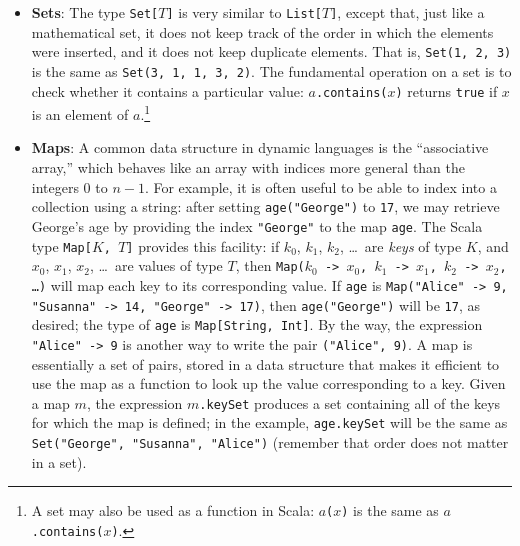 \begin{itemize}
\item \textbf{Sets}: The type \texttt{Set[$T$]} is very similar to \texttt{List[$T$]}, except that, just like a mathematical set, it does not keep track of the order in which the elements were inserted, and it does not keep duplicate elements. That is, \texttt{Set(1, 2, 3)} is the same as \texttt{Set(3, 1, 1, 3, 2)}. The fundamental operation on a set is to check whether it contains a particular value: \texttt{$a$.contains($x$)} returns \texttt{true} if $x$ is an element of $a$.\footnote{A set may also be used as a function in Scala: \texttt{$a$($x$)} is the same as \texttt{$a$.contains($x$)}.}

\item \textbf{Maps}: A common data structure in dynamic languages is the ``associative array,'' which behaves like an array with indices more general than the integers 0 to $n-1$. For example, it is often useful to be able to index into a collection using a string: after setting \texttt{age("George")} to \texttt{17}, we may retrieve George's age by providing the index \texttt{"George"} to the map \texttt{age}. The Scala type \texttt{Map[$K$, $T$]} provides this facility: if $k_0$, $k_1$, $k_2$, \ldots\ are \emph{keys} of type $K$, and $x_0$, $x_1$, $x_2$, \ldots\ are values of type $T$, then \texttt{Map($k_0$ -> $x_0$, $k_1$ -> $x_1$, $k_2$ -> $x_2$, \ldots)} will map each key to its corresponding value. If \texttt{age} is \texttt{Map("Alice" -> 9, "Susanna" -> 14, "George" -> 17)}, then \texttt{age("George")} will be \texttt{17}, as desired; the type of \texttt{age} is \texttt{Map[String, Int]}. By the way, the expression \texttt{"Alice" -> 9} is another way to write the pair \texttt{("Alice", 9)}. A map is essentially a set of pairs, stored in a data structure that makes it efficient to use the map as a function to look up the value corresponding to a key. Given a map $m$, the expression \texttt{$m$.keySet} produces a set containing all of the keys for which the map is defined; in the example, \texttt{age.keySet} will be the same as \texttt{Set("George", "Susanna", "Alice")} (remember that order does not matter in a set).


\end{itemize}

